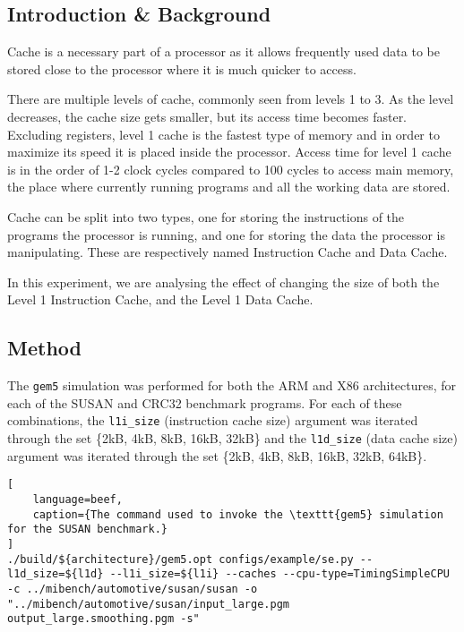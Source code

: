 
\subsection{Introduction \& Background}

Cache is a necessary part of a processor as it allows frequently used data to be stored
close to the processor where it is much quicker to access.

There are multiple levels of cache, commonly seen from levels 1 to 3.
As the level decreases, the cache size gets smaller, but its access time becomes faster.
Excluding registers, level 1 cache is the fastest type of memory and in order to maximize
its speed it is placed inside the processor.
Access time for level 1 cache is in the order of 1-2 clock cycles compared to 100 cycles
to access main memory, the place where currently running programs and all the working
data are stored.

Cache can be split into two types, one for storing the instructions of the programs the
processor is running, and one for storing the data the processor is manipulating.
These are respectively named Instruction Cache and Data Cache.

In this experiment, we are analysing the effect of changing the size of both the
Level 1 Instruction Cache, and the Level 1 Data Cache.

\subsection{Method}

The \texttt{gem5} simulation was performed for both the ARM and X86 architectures, for
each of the SUSAN and CRC32 benchmark programs.
For each of these combinations, the \texttt{l1i\_size} (instruction cache size) argument was
iterated through the set \{2kB, 4kB, 8kB, 16kB, 32kB\} and the \texttt{l1d\_size} (data cache size)
argument was iterated through the set \{2kB, 4kB, 8kB, 16kB, 32kB, 64kB\}.

\begin{lstlisting}[
    language=beef,
    caption={The command used to invoke the \texttt{gem5} simulation for the SUSAN benchmark.}
]
./build/${architecture}/gem5.opt configs/example/se.py --l1d_size=${l1d} --l1i_size=${l1i} --caches --cpu-type=TimingSimpleCPU -c ../mibench/automotive/susan/susan -o "../mibench/automotive/susan/input_large.pgm output_large.smoothing.pgm -s"
\end{lstlisting}

